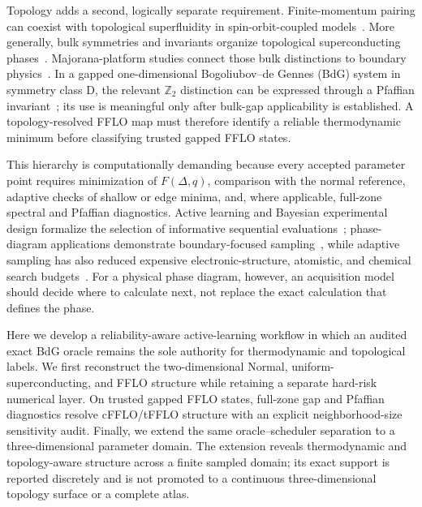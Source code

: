 Topology adds a second, logically separate requirement. Finite-momentum pairing can coexist with topological superfluidity in spin-orbit-coupled models~\cite{ZhangYi2013,QuEtAl2013,CaoEtAl2014}. More generally, bulk symmetries and invariants organize topological superconducting phases~\cite{ReadGreen2000,SatoAndo2017,QiZhang2011,SchnyderEtAl2008,RyuEtAl2010}. Majorana-platform studies connect those bulk distinctions to boundary physics~\cite{LutchynSauDasSarma2010,OregRefaelVonOppen2010,Alicea2012,Beenakker2013}. In a gapped one-dimensional Bogoliubov--de Gennes (BdG) system in symmetry class D, the relevant $\mathbb Z_2$ distinction can be expressed through a Pfaffian invariant~\cite{Kitaev2001,BudichArdonne2013}; its use is meaningful only after bulk-gap applicability is established. A topology-resolved FFLO map must therefore identify a reliable thermodynamic minimum before classifying trusted gapped FFLO states.

This hierarchy is computationally demanding because every accepted parameter point requires minimization of $F(\Delta,q)$, comparison with the normal reference, adaptive checks of shallow or edge minima, and, where applicable, full-zone spectral and Pfaffian diagnostics. Active learning and Bayesian experimental design formalize the selection of informative sequential evaluations~\cite{CohnAtlasLadner1994,MacKay1992,ShahriariEtAl2016}; phase-diagram applications demonstrate boundary-focused sampling~\cite{TerayamaEtAl2019,DaiBrussGlotzer2020,LookmanEtAl2019}, while adaptive sampling has also reduced expensive electronic-structure, atomistic, and chemical search budgets~\cite{TranUlissi2018,PodryabinkinShapeev2017,JinnouchiEtAl2019,VandermauseEtAl2020,BatraEtAl2021,NoeEtAl2019}. For a physical phase diagram, however, an acquisition model should decide where to calculate next, not replace the exact calculation that defines the phase.

Here we develop a reliability-aware active-learning workflow in which an audited exact BdG oracle remains the sole authority for thermodynamic and topological labels. We first reconstruct the two-dimensional Normal, uniform-superconducting, and FFLO structure while retaining a separate hard-risk numerical layer. On trusted gapped FFLO states, full-zone gap and Pfaffian diagnostics resolve cFFLO/tFFLO structure with an explicit neighborhood-size sensitivity audit. Finally, we extend the same oracle--scheduler separation to a three-dimensional parameter domain. The extension reveals thermodynamic and topology-aware structure across a finite sampled domain; its exact support is reported discretely and is not promoted to a continuous three-dimensional topology surface or a complete atlas.
